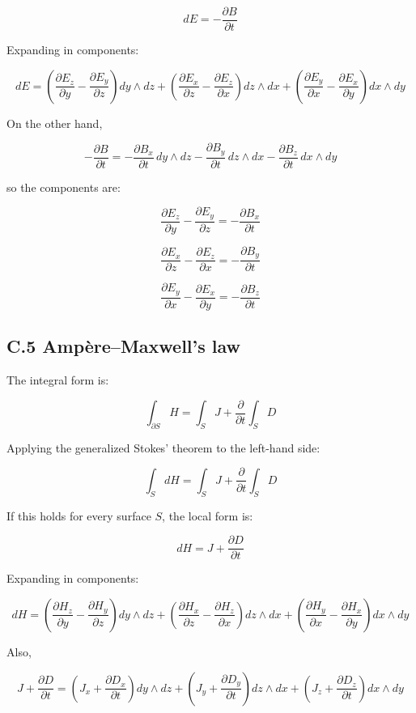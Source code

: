 \documentclass[a4paper,12pt,openany]{book}
\begin{document}
\[
dE=-\frac{\partial B}{\partial t}
\]

Expanding in components:

\[dE = \left(\frac{\partial E_z}{\partial y}-\frac{\partial E_y}{\partial z}\right)dy\wedge dz + \left(\frac{\partial E_x}{\partial z}-\frac{\partial E_z}{\partial x}\right)dz\wedge dx + \left(\frac{\partial E_y}{\partial x}-\frac{\partial E_x}{\partial y}\right)dx\wedge dy\]

On the other hand,

\[
-\frac{\partial B}{\partial t}
=
-\frac{\partial B_x}{\partial t}\,dy\wedge dz
-\frac{\partial B_y}{\partial t}\,dz\wedge dx
-\frac{\partial B_z}{\partial t}\,dx\wedge dy
\]

so the components are:

\[
\frac{\partial E_z}{\partial y}
-
\frac{\partial E_y}{\partial z}
=
-\frac{\partial B_x}{\partial t}
\]

\[
\frac{\partial E_x}{\partial z}
-
\frac{\partial E_z}{\partial x}
=
-\frac{\partial B_y}{\partial t}
\]

\[
\frac{\partial E_y}{\partial x}
-
\frac{\partial E_x}{\partial y}
=
-\frac{\partial B_z}{\partial t}
\]

\hypertarget{c.5-ampuxe8remaxwells-law}{%
\subsection*{C.5 Ampère–Maxwell's law}\label{c.5-ampuxe8remaxwells-law}}

The integral form is:

\[
\int_{\partial S}H
=
\int_S J+\frac{\partial}{\partial t}\int_S D
\]

Applying the generalized Stokes' theorem to the left-hand side:

\[
\int_S dH
=
\int_S J+\frac{\partial}{\partial t}\int_S D
\]

If this holds for every surface \(S\), the local form is:

\[
dH=J+\frac{\partial D}{\partial t}
\]

Expanding in components:

\[dH = \left(\frac{\partial H_z}{\partial y}-\frac{\partial H_y}{\partial z}\right)dy\wedge dz + \left(\frac{\partial H_x}{\partial z}-\frac{\partial H_z}{\partial x}\right)dz\wedge dx + \left(\frac{\partial H_y}{\partial x}-\frac{\partial H_x}{\partial y}\right)dx\wedge dy\]

Also,

\[J+\frac{\partial D}{\partial t} = \left(J_x+\frac{\partial D_x}{\partial t}\right)dy\wedge dz + \left(J_y+\frac{\partial D_y}{\partial t}\right)dz\wedge dx + \left(J_z+\frac{\partial D_z}{\partial t}\right)dx\wedge dy\]
\end{document}

